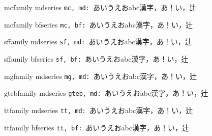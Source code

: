 \documentclass{ltjsarticle}
\begin{document}
\def\r#1#2{ \csname #1family \endcsname \csname #2series \endcsname
  {\tt #1, #2: }あいうえおabc漢字，あ！い，辻
}

\r{mc}{md}

\r{mc}{bf}



\r{sf}{md}

\r{sf}{bf}

\ifdefined\mgfamily
\r{mg}{md}
\fi

\ifdefined\gtebfamily
\r{gteb}{md}
\fi

\r{tt}{md}

\r{tt}{bf}
\end{document}
